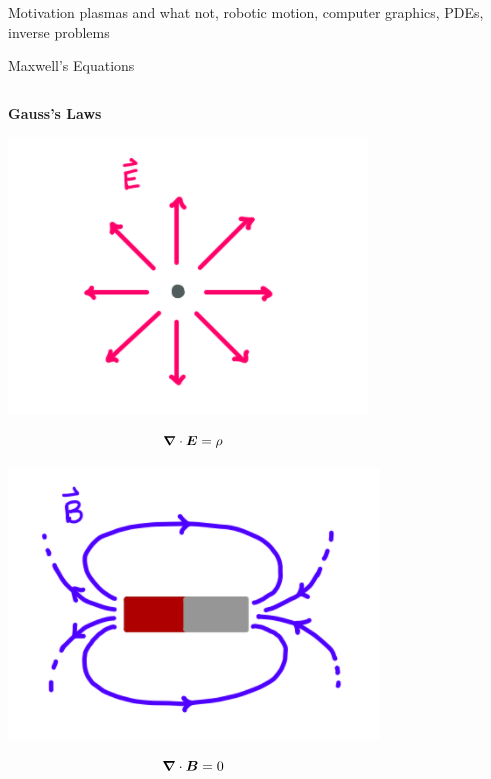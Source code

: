 \documentclass[UKenglish]{beamer}
\begin{document}
\begin{frame}{Motivation}
plasmas and what not, robotic motion, computer graphics, PDEs, inverse problems
\end{frame}

\begin{frame}{Maxwell's Equations}
    \begin{columns}[c] 

    
    \begin{center} \textbf{Gauss's Laws}
    
    \includegraphics[scale=.4]{figures/gauss_i.png}
    
    \vspace{-10mm}
    
    \small
    $$ \boldsymbol{\nabla}\cdot \boldsymbol{E} = \rho $$
    
    \includegraphics[scale=.4]{figures/gauss_ii.png}
    
    \vspace{-10mm}
    
    $$ \boldsymbol{\nabla} \cdot \boldsymbol{B} = 0 $$
    
    \end{center}
    

\end{columns}
\end{frame}
\end{document}
